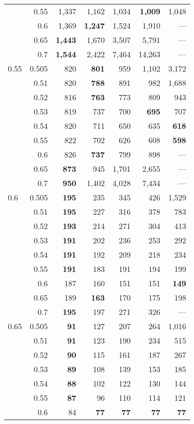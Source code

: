 \documentclass[aoas]{imsart}
\begin{document}
\begin{table}
\begin{tabular}{lr|rrrr|r}
     & 0.55 & 1,337 & 1,162 & 1,034 & \bf{1,009} & 1,048 \\
     & 0.6 & 1,369 & \bf{1,247} & 1,524 & 1,910 & --- \\
     & 0.65 & \bf{1,443} & 1,670 & 3,507 & 5,791 & --- \\
     & 0.7 & \bf{1,544} & 2,422 & 7,464 & 14,263 & --- \\
\hline
0.55 & 0.505 & 820 & \bf{801} & 959 & 1,102 & 3,172 \\
     & 0.51 & 820 & \bf{788} & 891 & 982 & 1,688 \\
     & 0.52 & 816 & \bf{763} & 773 & 809 & 943 \\
     & 0.53 & 819 & 737 & 700 & \bf{695} & 707 \\
     & 0.54 & 820 & 711 & 650 & 635 & \bf{618} \\
     & 0.55 & 822 & 702 & 626 & 608 & \bf{598} \\
     & 0.6 & 826 & \bf{737} & 799 & 898 & --- \\
     & 0.65 & \bf{873} & 945 & 1,701 & 2,655 & --- \\
     & 0.7 & \bf{950} & 1,402 & 4,028 & 7,434 & --- \\
\hline
0.6 & 0.505 & \bf{195} & 235 & 345 & 426 & 1,529 \\
    & 0.51 & \bf{195} & 227 & 316 & 378 & 783 \\
    & 0.52 & \bf{193} & 214 & 271 & 304 & 413 \\
    & 0.53 & \bf{191} & 202 & 236 & 253 & 292 \\
    & 0.54 & \bf{191} & 192 & 209 & 218 & 234 \\
    & 0.55 & \bf{191} & 183 & 191 & 194 & 199 \\
    & 0.6 & 187 & 160 & 151 & 151 & \bf{149} \\
    & 0.65 & 189 & \bf{163} & 170 & 175 & 198 \\
    & 0.7 & \bf{195} & 197 & 271 & 326 & --- \\
\hline
0.65 & 0.505 & \bf{9}1 & 127 & 207 & 264 & 1,016 \\
     & 0.51 & \bf{91} & 123 & 190 & 234 & 515 \\
     & 0.52 & \bf{90} & 115 & 161 & 187 & 267 \\
     & 0.53 & \bf{89} & 108 & 139 & 153 & 185 \\
     & 0.54 & \bf{88} & 102 & 122 & 130 & 144 \\
     & 0.55 & \bf{87} & 96 & 110 & 114 & 121 \\
     & 0.6 & 84 & \bf{77} & \bf{77} & \bf{77} & \bf{77} \\

\end{tabular}
\end{table}
\end{document}
